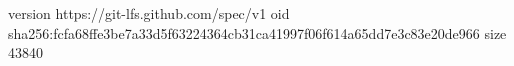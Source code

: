 version https://git-lfs.github.com/spec/v1
oid sha256:fcfa68ffe3be7a33d5f63224364cb31ca41997f06f614a65dd7e3c83e20de966
size 43840
